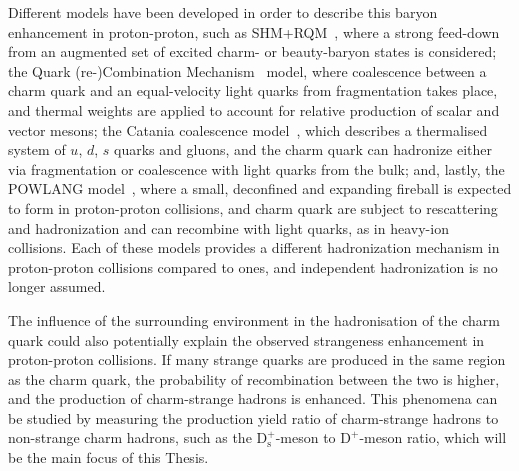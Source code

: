 Different models have been developed in order to describe this baryon enhancement in proton-proton, such as SHM+RQM~\cite{He:2019tik,He:2022tod}, where a strong feed-down from an augmented set of excited charm- or beauty-baryon states is considered; the Quark (re-)Combination Mechanism~\cite{Song:2018tpv} model, where coalescence between a charm quark and an equal-velocity light quarks from fragmentation takes place, and thermal weights are applied to account for relative production of scalar and vector mesons; the Catania coalescence model~\cite{Minissale:2020bif}, which describes a thermalised system of $u$, $d$, $s$ quarks and gluons, and the charm quark can hadronize either via fragmentation or coalescence with light quarks from the bulk; and, lastly, the POWLANG model~\cite{Beraudo:2023nlq}, where a small, deconfined and expanding fireball is expected to form in proton-proton collisions, and charm quark are subject to rescattering and hadronization and can recombine with light quarks, as in heavy-ion collisions. Each of these models provides a different hadronization mechanism in proton-proton collisions compared to \ee ones, and independent hadronization is no longer assumed. 

The influence of the surrounding environment in the hadronisation of the charm quark could also potentially explain the observed strangeness enhancement in proton-proton collisions. If many strange quarks are produced in the same region as the charm quark, the probability of recombination between the two is higher, and the production of charm-strange hadrons is enhanced. This phenomena can be studied by measuring the production yield ratio of charm-strange hadrons to non-strange charm hadrons, such as the $\mathrm{D_s^+}$-meson to $\mathrm{D^+}$-meson ratio, which will be the main focus of this Thesis.